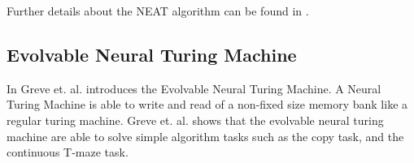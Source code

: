 \newpar Further details about the NEAT algorithm can be found in \cite{stanley2002evolving}.

\subsection{Evolvable Neural Turing Machine}
In \cite{greve2016evolving} Greve et. al. introduces the Evolvable Neural Turing Machine. A Neural Turing Machine is able to write and read of a non-fixed size memory bank like a regular turing machine. Greve et. al. shows that the evolvable neural turing machine are able to solve simple algorithm tasks such as the copy task, and the continuous T-maze task. 
